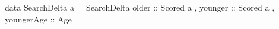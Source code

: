 data SearchDelta a
  = SearchDelta { older   :: Scored a
                , younger :: Scored a
                , youngerAge :: Age }
